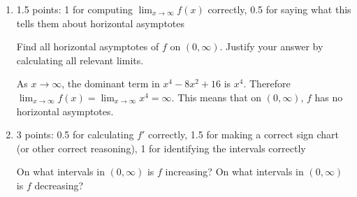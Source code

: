 \documentclass{article}
\begin{document}
\begin{enumerate}[resume]
\begin{enumerate}[resume]
    \begin{problem}[\vfill]
      Find and classify all discontinuities of $f$ on $(0, \infty)$. Justify your classifications using limits.
    \end{problem}

    \begin{solution}
      Since $f$ is given by a single (non-piecewise) formula, its discontinuities are where it's undefined. But we already saw that it's defined everywhere, so it has . 
    \end{solution}

  \item

    \begin{grading}
      1.5 points: 1 for computing $\displaystyle \lim_{x \to \infty} f(x)$ correctly, 0.5 for saying what this tells them about horizontal asymptotes 
    \end{grading}

    \begin{problem}[\vfill]
      Find all horizontal asymptotes of $f$ on $(0, \infty)$. Justify your answer by calculating all relevant limits. 
    \end{problem}

    \begin{solution}
      As $x\to \infty$, the dominant term in $x^4 - 8x^2 + 16$ is $x^4$. 
      Therefore $\displaystyle \lim_{x \to \infty} f(x) = \lim_{x \to \infty} x^4 = \infty$.
      This means that on $(0, \infty)$, $f$ has no horizontal asymptotes.
    \end{solution}

  \item

    \begin{grading}
      3 points: 0.5 for calculating $f'$ correctly, 1.5 for making a correct sign chart (or other correct reasoning), 1 for identifying the intervals correctly 
    \end{grading}

    \begin{problem}[\nstretch{1.5}]
      On what intervals in $(0, \infty)$ is $f$ increasing? On what intervals in $(0, \infty)$ is $f$ decreasing?
    \end{problem}


\end{enumerate}
\end{enumerate}
\end{document}
